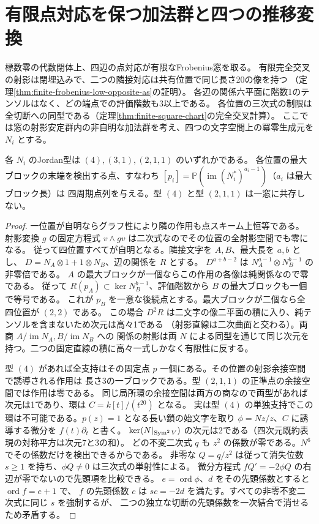 \section{有限点対応を保つ加法群と四つの推移変換}
\label{sec:finite-additive-windows}
標数零の代数閉体上、四辺の点対応が有限なFrobenius窓を取る。
有限完全交叉の射影は閉埋込みで、二つの隣接対応は共有位置で同じ長さ20の像を持つ
（定理\ref{thm:finite-frobenius-low-opposite-as}の証明）。
各辺の関係六平面に階数1のテンソルはなく、どの端点での評価階数も3以上である。
各位置の三次式の制限は全切断への同型である（定理\ref{thm:finite-square-chart}の完全交叉計算）。
ここでは窓の射影安定群内の非自明な加法群を考え、四つの文字空間上の冪零生成元を $N_i$ とする。

\begin{proposition}\label{prop:finite-additive-jordan}
各 $N_i$ のJordan型は $(4),(3,1),(2,1,1)$ のいずれかである。
各位置の最大ブロックの末端を検出する点、すなわち
$[p_i]=\mathbb P(\operatorname{im}(N_i^*)^{a_i-1})$（$a_i$ は最大ブロック長）は
四周期点列を与える。型 $(4)$ と型 $(2,1,1)$ は一窓に共存しない。
\end{proposition}
\begin{proof}
一位置が自明ならグラフ性により隣の作用も点スキーム上恒等である。
射影変換 $g$ の固定方程式 $v\wedge gv$ は二次式なのでその位置の全射影空間でも零になる。
従って四位置すべてが自明となる。隣接文字を $A,B$、最大長を $a,b$ とし、
$D=N_A\otimes1+1\otimes N_B$、辺の関係を $R$ とする。
$D^{a+b-2}$ は $N_A^{a-1}\otimes N_B^{b-1}$ の非零倍である。
$A$ の最大ブロックが一個ならこの作用の各像は純関係なので零である。
従って $R(p_A)\subset\ker N_B^{b-1}$、評価階数から $B$ の最大ブロックも一個で等号である。
これが $p_B$ を一意な後続点とする。最大ブロックが二個なら全四位置が $(2,2)$ である。
この場合 $D^2 R$ は二文字の像二平面の積に入り、純テンソルを含まないため次元は高々1である
（射影直線は二次曲面と交わる）。両商 $A/\operatorname{im}N_A,B/\operatorname{im}N_B$ への
関係の射影は両 $N$ による同型を通じて同じ次元を持つ。二つの固定直線の積に高々一式しかなく有限性に反する。

型 $(4)$ があれば全支持はその固定点 $p$ 一個にある。その位置の射影余接空間で誘導される作用は
長さ3の一ブロックである。型 $(2,1,1)$ の正準点の余接空間では作用は零である。
同じ局所環の余接空間は両方の商なので両型があれば次元は1であり、環は $C=k[t]/(t^{20})$ となる。
実は型 $(4)$ の単独支持でこの環は不可能である。$p(z)=1$ となる長い鎖の始文字を取り
$\phi=Nz/z$、$C$ に誘導する微分を $f(t)\partial_t$ と書く。
$\ker(N|_{\operatorname{Sym}^2 V})$ の次元は2である（四次元既約表現の対称平方は次元7と3の和）。
どの不変二次式 $q$ も $z^2$ の係数が零である。$N^6$ でその係数だけを検出できるからである。
非零な $Q=q/z^2$ は従って消失位数 $s\ge1$ を持ち、$\phi Q\ne0$ は三次式の単射性による。
微分方程式 $fQ'=-2\phi Q$ の右辺が零でないので先頭項を比較できる。
$e=\operatorname{ord}\phi$、$d$ をその先頭係数とすると $\operatorname{ord} f=e+1$ で、
$f$ の先頭係数 $c$ は $sc=-2d$ を満たす。すべての非零不変二次式に同じ $s$ を強制するが、
二つの独立な切断の先頭係数を一次結合で消せるため矛盾する。
\end{proof}

